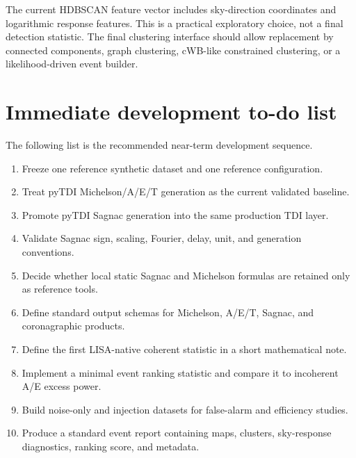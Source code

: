 \documentclass[%
 reprint,
 amsmath,amssymb,
 aps,
 prd,
]{revtex4-2}
\begin{document}
The current HDBSCAN feature vector includes sky-direction coordinates and logarithmic response features.  This is a practical exploratory choice, not a final detection statistic.  The final clustering interface should allow replacement by connected components, graph clustering, cWB-like constrained clustering, or a likelihood-driven event builder.

\section{Immediate development to-do list}
\label{app:todo}

The following list is the recommended near-term development sequence.

\begin{enumerate}
\item Freeze one reference synthetic dataset and one reference configuration.
\item Treat pyTDI Michelson/A/E/T generation as the current validated baseline.
\item Promote pyTDI Sagnac generation into the same production TDI layer.
\item Validate Sagnac sign, scaling, Fourier, delay, unit, and generation conventions.
\item Decide whether local static Sagnac and Michelson formulas are retained only as reference tools.
\item Define standard output schemas for Michelson, A/E/T, Sagnac, and coronagraphic products.
\item Define the first LISA-native coherent statistic in a short mathematical note.
\item Implement a minimal event ranking statistic and compare it to incoherent A/E excess power.
\item Build noise-only and injection datasets for false-alarm and efficiency studies.
\item Produce a standard event report containing maps, clusters, sky-response diagnostics, ranking score, and metadata.
\end{enumerate}


\end{document}
